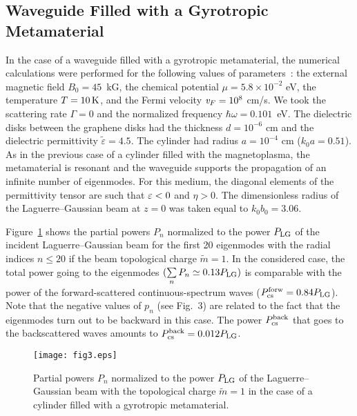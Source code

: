 \documentclass[conference,a4paper]{IEEEtran}
\begin{document}
\subsection{Waveguide Filled with a Gyrotropic Metamaterial}
In the case of a waveguide filled with a gyrotropic metamaterial, the numerical calculations were performed for the following values of parameters~\cite{Gusynin2007}: the external magnetic field $B_0=45$~kG, the chemical potential $\mu = 5{.}8\times 10^{-2}$ eV, the temperature $T=10\,{\rm K}$, and the Fermi velocity ${\it v}_F=10^8$ cm/s. We took the scattering rate $\Gamma=0$ and the normalized frequency $\hbar \omega = 0.101$~eV. The dielectric disks between the graphene disks had the thickness $d=10^{-6}$ cm and the dielectric permittivity $\tilde{\varepsilon}=4.5$. The cylinder had radius $a=10^{-4}$ cm ($k_0 a= 0.51$). As in the previous case of a cylinder filled with the magnetoplasma, the metamaterial is resonant and the waveguide supports the propagation of an infinite number of eigenmodes. For this medium, the diagonal elements of the permittivity tensor are such that $\varepsilon<0$ and $\eta>0$. The dimensionless radius of the Laguerre--Gaussian beam at $z=0$ was taken equal to $k_0 b_0 = 3.06$.





Figure~\ref{fig3} shows the partial powers $P_n$ normalized to the power $P_{\rm LG}$ of the incident Laguerre--Gaussian beam for the first 20 eigenmodes with the radial indices $n\leq 20$ if the beam topological charge $\tilde{m}=1$. In the considered case, the total power going to the eigenmodes $(\sum\limits_{n}P_n\simeq 0{.}13 P_{\rm LG})$ is comparable with the power of the forward-scattered continuous-spectrum waves ($P_{\rm cs}^{\rm forw} = 0{.}84 P_{\rm LG}$). Note that the negative values of $p_n$ (see Fig.~3) are related to the fact that the eigenmodes turn out to be backward in this case.
The power $P_{\rm cs}^{\rm back}$ that goes to the backscattered waves amounts to $P_{\rm cs}^{\rm back} = 0{.}012 P_{\rm LG}$.


{\enlargethispage{-3.1in}}

\begin{figure}[h]
	\texttt{[image: fig3.eps]}
	\caption{Partial powers $P_n$ normalized to the power $P_{\rm LG}$ of the Laguerre--Gaussian beam with the topological charge $\tilde{m}=1$ in the case of a cylinder filled with a gyrotropic metamaterial.} \label{fig3}
\end{figure}
\end{document}
